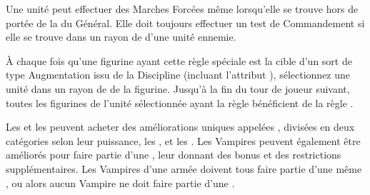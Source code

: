 
Une unité \vampiric{} peut effectuer des Marches Forcées même lorsqu'elle se trouve hors de portée de la \inspiringpresence{} du Général. Elle doit toujours effectuer un test de Commandement si elle se trouve dans un rayon de  d'une unité ennemie.


\armyspecialruleentry{\wakethedead}

À chaque fois qu'une figurine ayant cette règle spéciale est la cible d'un sort de type Augmentation issu de la Discipline \necromancy (incluant l'attribut \necromancyattribute{}), sélectionnez une unité dans un rayon de  de la figurine. Jusqu'à la fin du tour de joueur suivant, toutes les figurines de l'unité sélectionnée ayant la règle \undead{} bénéficient de la règle \lightningreflexes{}.

\armyspecialruleentry{\necromanticaura}




\armynewsection{\bloodlines}

Les \vampirelords{} et les \vampireheroes{} peuvent acheter des améliorations uniques appelées \bloodpowers{}, divisées en deux catégories selon leur puissance, les \bloodlinepowers{}, et les \ancientbloodpowers{}. Les Vampires peuvent également être améliorés pour faire partie d'une \bloodline{}, leur donnant des bonus et des restrictions supplémentaires. Les Vampires d'une armée doivent tous faire partie d'une même \bloodline{}, ou alors aucun Vampire ne doit faire partie d'une \bloodline{}. 


